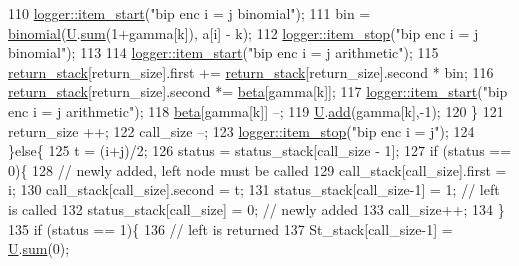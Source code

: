 \begin{DoxyCode}
110         \hyperlink{classlogger_a7e21ec6ad2d40cfc2c6a383521b5641a}{logger::item\_start}(\textcolor{stringliteral}{"bip enc i = j binomial"});
111         bin = \hyperlink{compression__helper_8cpp_acecca9cb279d3b3d82915a07d67818cf}{binomial}(\hyperlink{classb__graph__encoder_ac810138443002a2b2cf579ced2dc34ce}{U}.\hyperlink{classreverse__fenwick__tree_a672731fd6395b4853430073a099a80e6}{sum}(1+gamma[k]), a[i] - k);
112         \hyperlink{classlogger_a6775fee9681c437fc9c05d71cfbbe4a2}{logger::item\_stop}(\textcolor{stringliteral}{"bip enc i = j binomial"});
113 
114         \hyperlink{classlogger_a7e21ec6ad2d40cfc2c6a383521b5641a}{logger::item\_start}(\textcolor{stringliteral}{"bip enc i = j arithmetic"});
115         \hyperlink{namespacehelper__vars_a6d2100c373830cacd232319a9958652d}{return\_stack}[return\_size].first += \hyperlink{namespacehelper__vars_a6d2100c373830cacd232319a9958652d}{return\_stack}[return\_size].second * bin;
116         \hyperlink{namespacehelper__vars_a6d2100c373830cacd232319a9958652d}{return\_stack}[return\_size].second *= \hyperlink{classb__graph__encoder_ae54d76cc4cee399d98951f870897a144}{beta}[gamma[k]];
117         \hyperlink{classlogger_a7e21ec6ad2d40cfc2c6a383521b5641a}{logger::item\_start}(\textcolor{stringliteral}{"bip enc i = j arithmetic"});
118         \hyperlink{classb__graph__encoder_ae54d76cc4cee399d98951f870897a144}{beta}[gamma[k]] --;
119         \hyperlink{classb__graph__encoder_ac810138443002a2b2cf579ced2dc34ce}{U}.\hyperlink{classreverse__fenwick__tree_a942d7f49b37e53ebfec3076d177691d7}{add}(gamma[k],-1);
120       \}
121       return\_size ++;
122       call\_size --;
123       \hyperlink{classlogger_a6775fee9681c437fc9c05d71cfbbe4a2}{logger::item\_stop}(\textcolor{stringliteral}{"bip enc i = j"});
124     \}\textcolor{keywordflow}{else}\{
125       t = (i+j)/2;
126       status = status\_stack[call\_size - 1];
127       \textcolor{keywordflow}{if} (status == 0)\{
128         \textcolor{comment}{// newly added, left node must be called}
129         call\_stack[call\_size].first = i;
130         call\_stack[call\_size].second = t;
131         status\_stack[call\_size-1] = 1; \textcolor{comment}{// left is called}
132         status\_stack[call\_size] = 0; \textcolor{comment}{// newly added}
133         call\_size++;
134       \}
135       \textcolor{keywordflow}{if} (status == 1)\{
136         \textcolor{comment}{// left is returned}
137         St\_stack[call\_size-1] = \hyperlink{classb__graph__encoder_ac810138443002a2b2cf579ced2dc34ce}{U}.\hyperlink{classreverse__fenwick__tree_a672731fd6395b4853430073a099a80e6}{sum}(0);

\end{DoxyCode}
